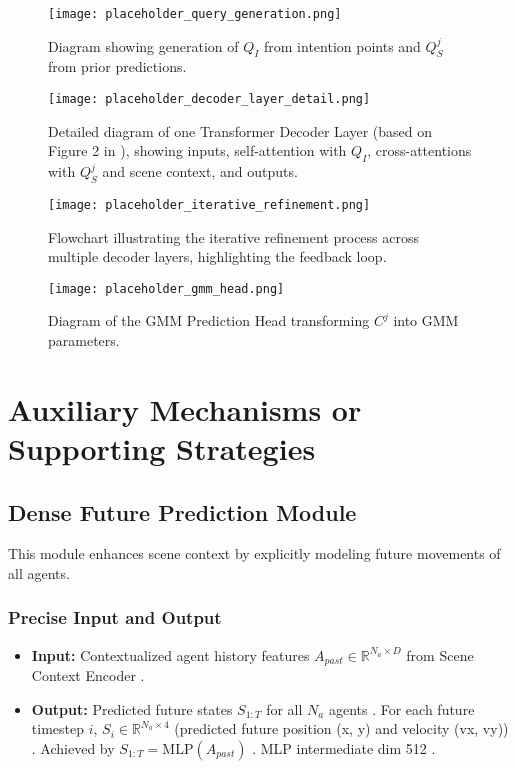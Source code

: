 \begin{figure}[h!]
    \centering
    \texttt{[image: placeholder\_query\_generation.png]} 
    \caption{Diagram showing generation of $Q_I$ from intention points and $Q_S^j$ from prior predictions.}
    \label{fig:query_generation}
\end{figure}
\begin{figure}[h!]
    \centering
    \texttt{[image: placeholder\_decoder\_layer\_detail.png]} 
    \caption{Detailed diagram of one Transformer Decoder Layer (based on Figure 2 in \cite{Shi2022MTR}), showing inputs, self-attention with $Q_I$, cross-attentions with $Q_S^j$ and scene context, and outputs.}
    \label{fig:decoder_layer_detail}
\end{figure}
\begin{figure}[h!]
    \centering
    \texttt{[image: placeholder\_iterative\_refinement.png]} 
    \caption{Flowchart illustrating the iterative refinement process across multiple decoder layers, highlighting the feedback loop.}
    \label{fig:iterative_refinement}
\end{figure}
\begin{figure}[h!]
    \centering
    \texttt{[image: placeholder\_gmm\_head.png]} 
    \caption{Diagram of the GMM Prediction Head transforming $C^j$ into GMM parameters.}
    \label{fig:gmm_head}
\end{figure}

\section{Auxiliary Mechanisms or Supporting Strategies}
\label{sec:auxiliary_mechanisms}

\subsection{Dense Future Prediction Module}
\label{subsec:dense_future_prediction}

This module enhances scene context by explicitly modeling future movements of all agents.

\subsubsection{Precise Input and Output}
\begin{itemize}
    \item \textbf{Input:} Contextualized agent history features $A_{past} \in \mathbb{R}^{N_a \times D}$ from Scene Context Encoder \cite{Shi2022MTR}.
    \item \textbf{Output:} Predicted future states $S_{1:T}$ for all $N_a$ agents \cite{Shi2022MTR}. For each future timestep $i$, $S_i \in \mathbb{R}^{N_a \times 4}$ (predicted future position (x, y) and velocity (vx, vy)) \cite{Shi2022MTR}. Achieved by $S_{1:T} = \text{MLP}(A_{past})$ \cite{Shi2022MTR}. MLP intermediate dim 512 \cite{Shi2022MTR}.
\end{itemize}

